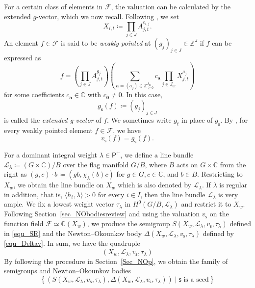 \documentclass[11pt]{amsart}
\newcommand{\C}{\mathbb{C}}
\newcommand{\Z}{\mathbb{Z}}
\def\mcal{\mathcal}
\numberwithin{equation}{section}
\theoremstyle{plain}
\theoremstyle{definition}
\numberwithin{equation}{section}
\newcommand{\seed}{\mathsf{s}}
\newcommand{\Lb}{\mathcal{L}}
\begin{document}
For a certain class of elements in $\mathcal{F}$, the valuation can be calculated by the extended $g$-vector, which we now recall. Following \cite{FominZelevinsky4, FockGoncharov}, we set
$$
X_{i,t} \coloneqq \prod_{j \in J} A_{j,t}^{\varepsilon_{i,j}}.
$$
An element $f \in \mathcal{F}$ is said to be \emph{weakly pointed} at $(g_j)_{j \in J} \in \Z^J$ if $f$ can be expressed as
\begin{equation}\label{equ_extgvector}
f = \left( \prod_{j \in J} A^{g_j}_{j,t} \right) \left( \sum_{\mathbf{a} = (a_{j}) \in \mathbb{Z}^{J_\mathrm{uf}}_{\geq 0} } c_\mathbf{a} \prod_{j \in J_\mathrm{uf}} X_{j,t}^{a_j} \right)
\end{equation}
for some coefficients $c_{\mathbf{a}} \in \mathbb{C}$ with $c_{\mathbf{0}} \neq 0$. In this case, 
$$
g_{\seed}(f) \coloneqq (g_j)_{j \in J}
$$ 
is called the \emph{extended g-vector} of $f$. We sometimes write $g_t$ in place of $g_{\seed}$. By \cite[Proposition 3.9]{FO25}, for every weakly pointed element $f \in \mathcal{F}$, we have
\begin{equation}\label{equ_val=g}
v_\seed(f) = g_\seed(f).    
\end{equation}

For a dominant integral weight $\lambda \in \mathsf{P}^+$, we define a line bundle $\Lb_\lambda \coloneqq (G \times \C)/B$ over the flag manifold $G/B$, where $B$ acts on $G\times \C$ from the right as $ (g,c) \cdot b \coloneqq (gb, \chi_\lambda(b) c)$ for $g\in G, c\in \C$, and $b\in B$. Restricting to $X_w$, we obtain the line bundle on $X_w$ which is also denoted by $\Lb_\lambda$. If $\lambda$ is regular in addition, that is, $\langle h_i, \lambda \rangle >0$ for every $i\in I$, then the line bundle $\mcal{L}_\lambda$ is very ample. We fix a lowest weight vector $\tau_\lambda$ in $H^0(G/B, \Lb_\lambda)$ and restrict it to $X_w$. Following Section~\ref{sec_NObodiesreview} and using the valuation $v_\seed$ on the function field $\mathcal{F} \simeq \C(X_w)$, we produce the semigroup $S(X_w, \mcal{L}_\lambda,v_\seed,\tau_\lambda)$ defined in \eqref{equ_SR} and the Newton--Okounkov body $\Delta(X_w, \mcal{L}_\lambda,v_\seed,\tau_\lambda)$ defined by \eqref{equ_Deltav}. In sum, we have the quadruple
\begin{equation}\label{equ_quadrupleonxw}
(X_w,\mcal{L}_\lambda,v_\seed,\tau_\lambda)
\end{equation}
By following the procedure in Section~\ref{Sec_NOp}, we obtain  the family of semigroups and Newton--Okounkov bodies 
\begin{equation}\label{equ_familyofseminewto}
\left\{ \left( S(X_w, \mcal{L}_\lambda, v_{\seed}, \tau_\lambda), \Delta(X_w, \mcal{L}_\lambda, v_{\seed}, \tau_\lambda) \right) \mid \mbox{$\seed$ is a seed} \right\}
\end{equation}
\end{document}

